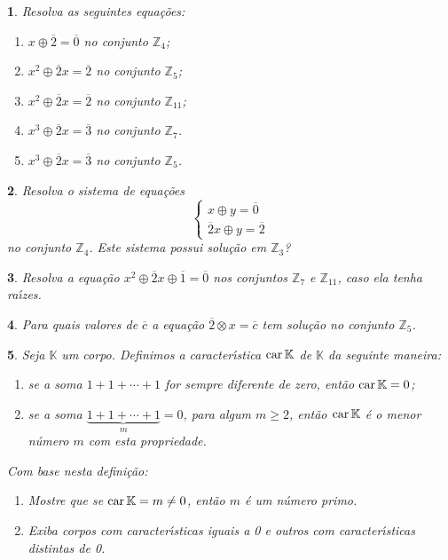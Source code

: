 \documentclass[12pt]{exam}
\newtheorem{exercicio}{}
\newcommand{\z}{\mathbb{Z}}
\newcommand{\cp}[1]{\mathbb{#1}}
\newcommand{\ch}{\mbox{\textrm{car\,}}\nobreak}
\begin{document}
\begin{exercicio}
Resolva as seguintes equa\c{c}\~oes:
\begin{enumerate}[label={\alph*})]
  \item $x \oplus \overline{2} = \overline{0}$ no conjunto $\z_4$;
  \item $x^2 \oplus \overline{2}x = \overline{2}$ no conjunto $\z_5$;
  \item $x^2 \oplus \overline{2}x = \overline{2}$ no conjunto $\z_11$;
  \item $x^3 \oplus \overline{2}x = \overline{3}$ no conjunto $\z_7$.
  \item $x^3 \oplus \overline{2}x = \overline{3}$ no conjunto $\z_5$.
\end{enumerate}
\end{exercicio}

\begin{exercicio}
  Resolva o sistema de equa\c{c}\~oes
  \[
    \begin{cases}
      x \oplus y = \overline{0}\\
      \overline{2}x \oplus y = \overline{2}
    \end{cases}
  \]
  no conjunto $\z_4$. Este sistema possui solu\c{c}\~ao em $\z_3$?
\end{exercicio}

\begin{exercicio}
  Resolva a equa\c{c}\~ao $x^2 \oplus \overline{2}x \oplus \overline{1} = \overline{0}$ nos conjuntos $\z_7$ e $\z_{11}$, caso ela tenha ra{\'\i}zes.
\end{exercicio}

\begin{exercicio}
  Para quais valores de $\overline{c}$ a equa\c{c}\~ao $\overline{2}\otimes x = \overline{c}$ tem solu\c{c}\~ao no conjunto $\z_5$.
\end{exercicio}

\begin{exercicio}
Seja $\cp{K}$ um corpo. Definimos a caracter{\'\i}stica \textbf{$\ch \cp{K}$} de $\cp{K}$ da seguinte maneira:
\begin{enumerate}[label=({\roman*})]
  \item se a soma $1 + 1 + \cdots + 1$ for sempre diferente de zero, ent\~ao \textbf{$\ch \cp{K} = 0$};
  \item se a soma $\underbrace{1 + 1 + \cdots + 1}_{m} = 0$, para algum $m \ge 2$, ent\~ao \textbf{$\ch \cp{K}$} \'e o menor n\'umero $m$ com esta propriedade.
\end{enumerate}
Com base nesta defini\c{c}\~ao:
\begin{enumerate}[label={\alph*})]
  \item Mostre que se $\ch \cp{K} = m \ne 0$, ent\~ao $m$ \'e um n\'umero primo.
  \item Exiba corpos com caracter{\'\i}sticas iguais a 0 e outros com caracter{\'\i}sticas distintas de 0.
\end{enumerate}
\end{exercicio}
\end{document}
